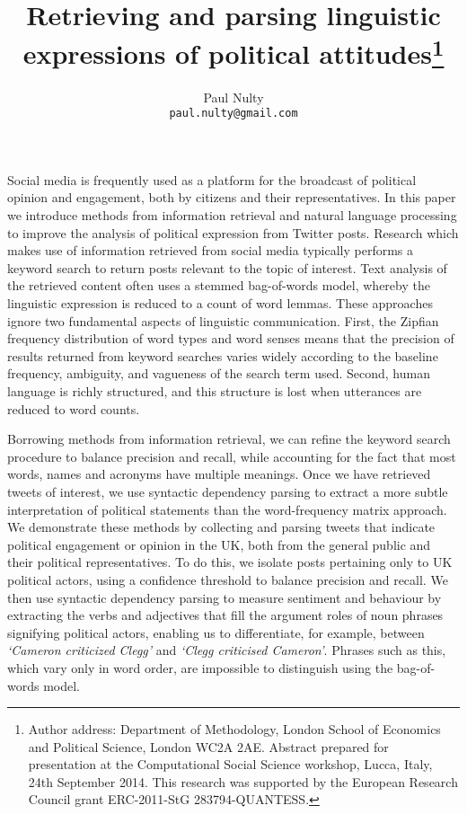 \documentclass[11pt,a4paper]{article}
\begin{document}
\thispagestyle{empty}

\title{\textbf{Retrieving and parsing linguistic expressions of political attitudes}\footnote{Author address: Department of Methodology, London School of Economics and Political Science, London WC2A 2AE. Abstract prepared for presentation at the Computational Social Science workshop, Lucca, Italy, 24th September 2014. This
    research was supported by the European Research Council grant
    ERC-2011-StG 283794-QUANTESS. }}
\author{Paul Nulty \\
{\texttt{paul.nulty@gmail.com}}
}


\date{} %
\maketitle
\thispagestyle{empty} %
Social media is frequently used as a platform for the broadcast of political opinion and engagement, both by citizens and their representatives. In this paper we introduce methods from information retrieval and natural language processing to improve the analysis of political expression from Twitter posts. Research which makes use of information retrieved from social media typically performs a keyword search to return posts relevant to the topic of interest. Text analysis of the retrieved content often uses a stemmed bag-of-words model, whereby the linguistic expression is reduced to a count of word lemmas. These approaches ignore two fundamental aspects of linguistic communication. First, the Zipfian frequency distribution of word types and word senses means that the precision of results returned from keyword searches varies widely according to the baseline frequency, ambiguity, and vagueness of the search term used. Second, human language is richly structured, and this structure is lost when utterances are reduced to word counts. 

Borrowing methods from information retrieval, we can refine the keyword search procedure to balance precision and recall, while accounting for the fact that most words, names and acronyms have multiple meanings. Once we have retrieved tweets of interest, we use syntactic dependency parsing to extract a more subtle interpretation of political statements than the word-frequency matrix approach. We demonstrate these methods by collecting and parsing tweets that indicate political engagement or opinion in the UK, both from the general public and their political representatives. To do this, we isolate posts pertaining only to UK political actors, using a confidence threshold to balance precision and recall. We then use syntactic dependency parsing to measure sentiment and behaviour by extracting the verbs and adjectives that fill the argument roles of noun phrases signifying political actors, enabling us to differentiate, for example, between \textit{`Cameron criticized Clegg'} and \textit{`Clegg criticised Cameron'}. Phrases such as this, which vary only in word order, are impossible to distinguish using the bag-of-words model.
\end{document}
